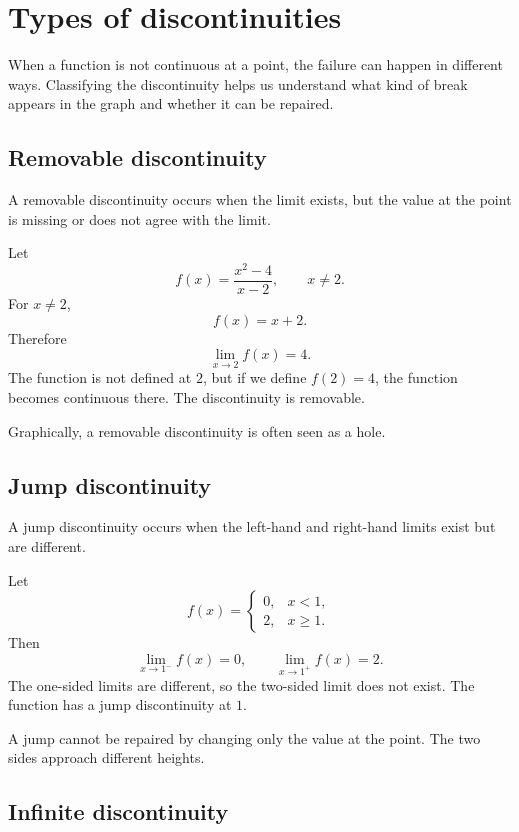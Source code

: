 \section{Types of discontinuities}

When a function is not continuous at a point, the failure can happen in different ways. Classifying the discontinuity helps us understand what kind of break appears in the graph and whether it can be repaired.

\subsection*{Removable discontinuity}

A removable discontinuity occurs when the limit exists, but the value at the point is missing or does not agree with the limit.

\begin{examplebox}
Let
\[
f(x)=\frac{x^2-4}{x-2},
\qquad x\ne2.
\]
For \(x\ne2\),
\[
f(x)=x+2.
\]
Therefore
\[
\lim_{x\to2}f(x)=4.
\]
The function is not defined at \(2\), but if we define \(f(2)=4\), the function becomes continuous there. The discontinuity is removable.
\end{examplebox}

Graphically, a removable discontinuity is often seen as a hole.

\subsection*{Jump discontinuity}

A jump discontinuity occurs when the left-hand and right-hand limits exist but are different.

\begin{examplebox}
Let
\[
f(x)=
\begin{cases}
0, & x<1,\\
2, & x\ge1.
\end{cases}
\]
Then
\[
\lim_{x\to1^-}f(x)=0,
\qquad
\lim_{x\to1^+}f(x)=2.
\]
The one-sided limits are different, so the two-sided limit does not exist. The function has a jump discontinuity at \(1\).
\end{examplebox}

A jump cannot be repaired by changing only the value at the point. The two sides approach different heights.

\subsection*{Infinite discontinuity}

